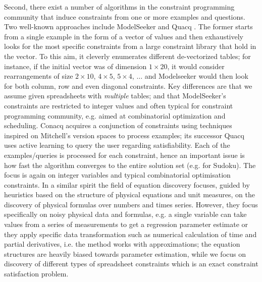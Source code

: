 Second, there exist a number of algorithms in the constraint programming community that induce constraints from one or more examples and questions. Two well-known approaches include ModelSeeker \cite{modelseeker} and Quacq \cite{Quacq}.
The former starts from a single example in the form of a vector of values and then exhaustively looks for the most specific constraints from a large constraint library that hold in the vector. To this aim, it cleverly enumerates different de-vectorized tables; for instance, if the initial vector was of dimension $1 \times 20$, it would consider rearrangements of size $2 \times 10$, $4 \times 5$, $5 \times 4$, $\dots$ and Modelseeker would then look for both column, row  and even diagonal constraints. Key differences are that we assume given spreadsheets with \textit{multiple} tables; and that ModelSeeker's constraints are restricted to integer values and often typical for constraint programming community, e.g. aimed at combinatorial optimization and scheduling. Conacq \cite{Conacq} acquires a conjunction of constraints using techniques inspired on Mitchell's version spaces to process examples; its successor Quacq uses active learning to query the user regarding satisfiability. Each of the examples/queries is processed for each constraint, hence an important issue is how fast the algorithm converges to the entire solution set (e.g. for Sudoku).
The focus is again on integer variables and typical combinatorial optimisation constraints. In a similar spirit the field of equation discovery \cite{equation_discovery} focuses, guided by  heuristics based on the structure of physical equations and unit measures, on the discovery of physical formulas over numbers and times series.
However, they focus specifically on noisy physical data and formulas, e.g. a single variable can take values from a series of measurements to get a regression parameter estimate or they apply specific data transformation such as numerical calculation of time and partial derivatives, i.e. the method works with approximations; the equation structures are heavily biased towards parameter estimation, while we focus on discovery of different types of spreadsheet constraints which is an exact constraint satisfaction problem.



